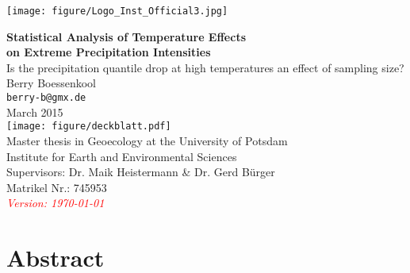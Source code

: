 \documentclass[a4paper]{article}
\newcommand{\todo}[1]{\emph{\textcolor{red}{#1}}}
\begin{document}
\thispagestyle{empty}
\begin{flushright}
\texttt{[image: figure/Logo\_Inst\_Official3.jpg]}\\[1em]
\end{flushright}
\begin{center}
\LARGE
\textbf{Statistical Analysis of Temperature Effects\\on Extreme Precipitation Intensities}\\[1em]
\large
Is the precipitation quantile drop at high temperatures an effect of sampling size?\\[2em]
Berry Boessenkool\\[0.5em] 
\texttt{berry-b@gmx.de}\\[0.5em]
March 2015\\
\vspace{2em}
\texttt{[image: figure/deckblatt.pdf]}\\
\vspace{3em}
Master thesis in Geoecology at the University of Potsdam\\
Institute for Earth and Environmental Sciences\\
Supervisors: Dr. Maik Heistermann \& Dr. Gerd Bürger\\
Matrikel Nr.: 745953\\
\normalsize 
\todo{Version: \today\ \currenttime}

\end{center}%


\pagebreak

\hypertarget{Abstract}{}
\section*{Abstract} %
\end{document}
